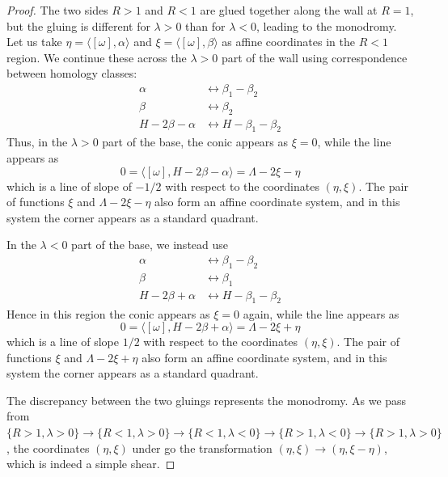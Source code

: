 \documentclass[12pt]{amsart}
\begin{document}
\begin{proof}
  The two sides $R > 1$ and $R < 1$ are glued together along the wall
  at $R = 1$, but
  the gluing is different for $\lambda > 0$ than for $\lambda < 0$,
  leading to the monodromy. Let us take $\eta = \langle
  [\omega],\alpha\rangle$ and $\xi = \langle [\omega],\beta\rangle$ as
  affine coordinates in the $R < 1$ region. We continue these across
  the $\lambda > 0$ part of the wall using correspondence between
  homology classes:
  \begin{equation}
    \begin{split}
      \alpha &\leftrightarrow \beta_1-\beta_2\\
      \beta &\leftrightarrow \beta_2\\
      H-2\beta-\alpha &\leftrightarrow H-\beta_1-\beta_2
      \end{split}
  \end{equation}
  Thus, in the $\lambda > 0$ part of the base, the conic appears as
  $\xi = 0$, while the line appears as 
  \begin{equation}
    0 = \langle [\omega],H - 2\beta - \alpha\rangle = \Lambda - 2\xi - \eta
  \end{equation}
  which is a line of slope of $-1/2$ with respect to the coordinates $(\eta,\xi)$. The pair of functions $\xi$ and $\Lambda -2\xi -\eta$ also form an affine coordinate system, and in this system the corner appears as a standard quadrant.

  In the $\lambda < 0$ part of the base, we instead use
    \begin{equation}
    \begin{split}
      \alpha &\leftrightarrow \beta_1-\beta_2\\
      \beta &\leftrightarrow \beta_1\\
      H-2\beta+\alpha &\leftrightarrow H-\beta_1-\beta_2
      \end{split}
  \end{equation}
  Hence in this region the conic appears as $\xi = 0$ again, while the
  line appears as 
  \begin{equation}
       0 = \langle [\omega],H - 2\beta + \alpha\rangle = \Lambda - 2\xi + \eta
  \end{equation}
  which is a line of slope $1/2$ with respect to the coordinates
  $(\eta,\xi)$. The pair of functions $\xi$ and $\Lambda -2\xi +\eta$ also form an affine coordinate system, and in this system the corner appears as a standard quadrant.
  
  The discrepancy between the two gluings represents the monodromy. As
  we pass from $\{R > 1, \lambda > 0\} \to \{R< 1, \lambda > 0\} \to
  \{R < 1,\lambda < 0\} \to \{R > 1, \lambda < 0\} \to \{R > 1,\lambda
  > 0\}$, the coordinates $(\eta,\xi)$ under go the transformation
  $(\eta,\xi) \to (\eta, \xi-\eta)$, which is indeed a simple shear.

  
\end{proof}
\end{document}
